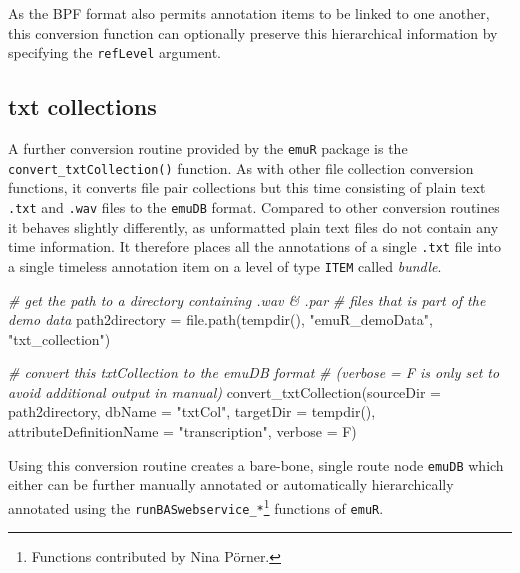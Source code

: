 \documentclass[
]{book}
\newenvironment{Shaded}{\begin{snugshade}}{\end{snugshade}}
\newcommand{\AttributeTok}[1]{\textcolor[rgb]{0.77,0.63,0.00}{#1}}
\newcommand{\CommentTok}[1]{\textcolor[rgb]{0.56,0.35,0.01}{\textit{#1}}}
\newcommand{\FunctionTok}[1]{\textcolor[rgb]{0.00,0.00,0.00}{#1}}
\newcommand{\NormalTok}[1]{#1}
\newcommand{\OtherTok}[1]{\textcolor[rgb]{0.56,0.35,0.01}{#1}}
\newcommand{\StringTok}[1]{\textcolor[rgb]{0.31,0.60,0.02}{#1}}
\begin{document}
As the BPF format also permits annotation items to be linked to one another, this conversion function can optionally preserve this hierarchical information by specifying the \texttt{refLevel} argument.

\hypertarget{txt-collections}{%
\subsection{txt collections}\label{txt-collections}}

A further conversion routine provided by the \texttt{emuR} package is the \texttt{convert\_txtCollection()} function. As with other file collection conversion functions, it converts file pair collections but this time consisting of plain text \texttt{.txt} and \texttt{.wav} files to the \texttt{emuDB} format. Compared to other conversion routines it behaves slightly differently, as unformatted plain text files do not contain any time information. It therefore places all the annotations of a single \texttt{.txt} file into a single timeless annotation item on a level of type \texttt{ITEM} called \emph{bundle}.

\begin{Shaded}
\begin{Highlighting}[]
\CommentTok{\# get the path to a directory containing .wav \& .par}
\CommentTok{\# files that is part of the demo data}
\NormalTok{path2directory }\OtherTok{=} \FunctionTok{file.path}\NormalTok{(}\FunctionTok{tempdir}\NormalTok{(),}
                           \StringTok{"emuR\_demoData"}\NormalTok{,}
                           \StringTok{"txt\_collection"}\NormalTok{)}

\CommentTok{\# convert this txtCollection to the emuDB format}
\CommentTok{\# (verbose = F is only set to avoid additional output in manual)}
\FunctionTok{convert\_txtCollection}\NormalTok{(}\AttributeTok{sourceDir =}\NormalTok{ path2directory,}
                      \AttributeTok{dbName =} \StringTok{"txtCol"}\NormalTok{,}
                      \AttributeTok{targetDir =} \FunctionTok{tempdir}\NormalTok{(),}
                      \AttributeTok{attributeDefinitionName =} \StringTok{"transcription"}\NormalTok{,}
                      \AttributeTok{verbose =}\NormalTok{ F)}
\end{Highlighting}
\end{Shaded}

Using this conversion routine creates a bare-bone, single route node \texttt{emuDB} which either can be further manually annotated or automatically hierarchically annotated using the \texttt{runBASwebservice\_*}\footnote{Functions contributed by Nina Pörner.} functions of \texttt{emuR}.
\end{document}
